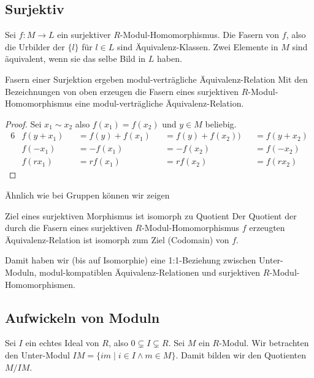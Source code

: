 \documentclass[a4paper]{amsart}
\theoremstyle{definition}
\begin{document}
\subsection{Surjektiv}
Sei $f \colon M \to L$ ein surjektiver $R$-Modul-Homomorphismus. Die Fasern von $f$, also die Urbilder  der $\{l\}$ für $l \in L$ sind Äquivalenz-Klassen. Zwei Elemente in $M$ sind äquivalent, wenn sie das selbe Bild in $L$ haben.
\begin{Satz}{Fasern einer Surjektion ergeben modul-verträgliche Äquivalenz-Relation}
   Mit den Bezeichnungen von oben erzeugen die Fasern eines surjektiven $R$-Modul-Homomorphismus eine modul-verträgliche Äquivalenz-Relation.
\end{Satz}
\begin{proof}
   Sei $x_1 \sim x_2$ also $f(x_1) = f(x_2)$ und $y \in M$ beliebig.
   \begin{alignat}{6}
      &f(y + x_1) &&= f(y) + f(x_1) &&= f(y) + f(x_2) ) &&= f(y + x_2)\\
      &f(-x_1)    &&= -f(x_1)       &&= -f(x_2)         &&= f(-x_2)\\
      &f(rx_1)    &&= rf(x_1)       &&= rf(x_2)         &&= f(rx_2)
   \end{alignat}
\end{proof}

Ähnlich wie bei Gruppen können wir zeigen
\begin{Satz}{Ziel eines surjektiven Morphismus ist isomorph zu Quotient}
   Der Quotient der durch die Fasern eines surjektiven $R$-Modul-Homomorphismus $f$ erzeugten Äquivalenz-Relation ist isomorph zum Ziel (Codomain) von $f$.
\end{Satz}

{\color{red}Damit haben wir (bis auf Isomorphie) eine 1:1-Beziehung zwischen Unter-Moduln, modul-kompatiblen Äquivalenz-Relationen und surjektiven $R$-Modul-Homomorphismen.}

\subsection{Aufwickeln von Moduln}
Sei $I$ ein echtes Ideal von $R$, also $0 \subsetneq I \subsetneq R$. Sei $M$ ein $R$-Modul. Wir betrachten den Unter-Modul $IM = \{im \mid i \in I \land m \in M\}$. Damit bilden wir den Quotienten $M/IM$.
\end{document}
